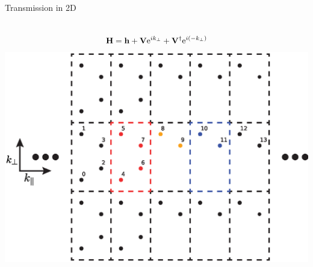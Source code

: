 \documentclass[hyperref={colorlinks=true,urlcolor=blue,linkcolor=.},aspectratio=1610,mathserif]{beamer}
\newcommand{\me}{\mathrm{e}}
\newcommand{\im}[3]{\inputminted[linenos=true, python3=true, firstline=#2, lastline=#3]{python}{#1}}
\begin{document}
\begin{frame}{Transmission in 2D}
	\centering
	\begin{columns}[c]
		\begin{align*}
			\vb{H} = \vb{h} + \vb{V}\me^{ik_{\perp}} + \vb{V}^{\dagger} \me^{i\pqty{-k_{\perp}}}
		\end{align*}
		\includegraphics[width=.7\textwidth]{Figures/2DTrans.eps}
	\end{columns}
	\begin{columns}[c]
		\im{Listings/Functions.py}{250}{253}
	\end{columns}

\end{frame}
\end{document}
